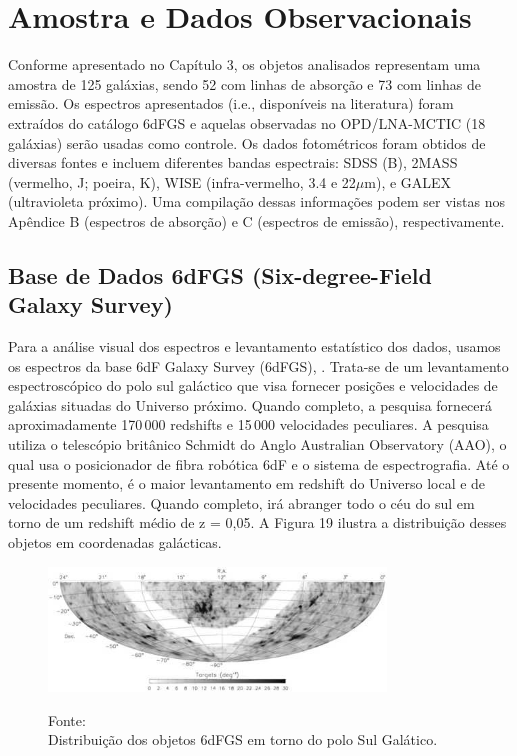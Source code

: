 \chapter{Amostra e Dados Observacionais}

Conforme apresentado no Capítulo 3, os objetos analisados representam uma amostra de 125 galáxias, sendo 52 com linhas de absorção e 73 com linhas de emissão. Os espectros apresentados (i.e., disponíveis na literatura) foram extraídos do catálogo 6dFGS \cite{jones20046df} e aquelas observadas no OPD/LNA-MCTIC (18 galáxias) serão usadas como controle. Os dados fotométricos foram obtidos de diversas fontes e incluem diferentes bandas espectrais: SDSS (B), 2MASS (vermelho, J; poeira, K), WISE (infra-vermelho, 3.4 e 22$\mu$m), e GALEX (ultravioleta próximo). Uma compilação dessas informações podem ser vistas nos Apêndice B (espectros de absorção) e C (espectros de emissão), respectivamente.


\section{Base de Dados 6dFGS (Six-degree-Field Galaxy Survey)}

Para a análise visual dos espectros e levantamento estatístico dos dados, usamos os espectros da base 6dF Galaxy Survey (6dFGS), \cite{jones20046df}. Trata-se de um levantamento espectroscópico do polo sul galáctico que visa fornecer  posições e velocidades de galáxias situadas do Universo próximo. Quando completo, a pesquisa fornecerá aproximadamente 170\,000 redshifts e 15\,000 velocidades peculiares. A pesquisa utiliza o telescópio britânico Schmidt do Anglo Australian Observatory (AAO), o qual usa o posicionador de fibra robótica 6dF e o sistema de espectrografia. Até o presente momento, é o maior levantamento em redshift do Universo local e de velocidades peculiares. Quando completo, irá abranger todo o céu do sul em torno de um redshift médio de z = 0,05. A Figura 19 ilustra a distribuição desses objetos em coordenadas galácticas.

\begin{figure}[!htbp]
	\centering	
    \caption{}
    \includegraphics[width=0.8\textwidth]{figuras/6df.jpg}
   	\begin{center}
        \normalsize Fonte: \cite{jarrett2004large} \\Distribuição dos objetos 6dFGS em torno do polo Sul Galático.
    \end{center}
	\label{fig:sbmt-moses}
\end{figure}

